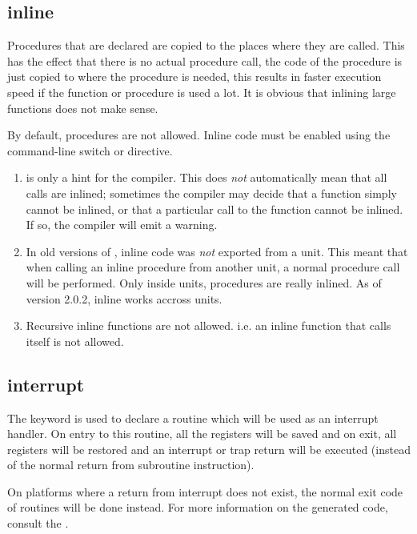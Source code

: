\subsection{inline}
\label{se:inline}
Procedures that are declared  are copied to the places where they
are called. This has the effect that there is no actual procedure call,
the code of the procedure is just copied to where the procedure is needed,
this results in faster execution speed if the function or procedure is
used a lot. It is obvious that inlining large functions does not make sense.

By default,  procedures are not allowed. Inline code must be enabled
using the command-line switch  or 
directive.

\begin{remark}
\begin{enumerate}
\item {} is only a hint for the compiler. This does {\em not}
automatically mean that all calls are inlined; sometimes the compiler
may decide that a function simply cannot be inlined, or that a particular call
to the function cannot be inlined. If so, the compiler will emit a warning.
\item In old versions of \fpc, inline code was {\em not} exported from a unit. This
meant that when calling an inline procedure from another unit, a normal procedure 
call will be performed. Only inside units,  procedures are really inlined.
As of version 2.0.2, inline works accross units.
\item Recursive inline functions are not allowed. i.e. an inline function
that calls itself is not allowed.
\end{enumerate}
\end{remark}

\subsection{interrupt}
\label{se:interrupt}
The  keyword is used to declare a routine which will
be used as an interrupt handler. On entry to this routine, all the registers
will be saved and on exit, all registers will be restored
and an interrupt or trap return will be executed (instead of the normal return
from subroutine instruction).

On platforms where a return from interrupt does not exist, the normal exit
code of routines will be done instead. For more information on the generated
code, consult the \progref.

